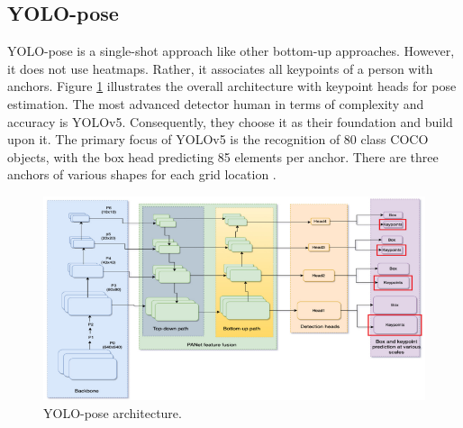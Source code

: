 \subsection{YOLO-pose}
\label{subsec:yolopose}

YOLO-pose is a single-shot approach like other bottom-up approaches. However, it does not use heatmaps. Rather, it associates all keypoints of a person with anchors. Figure \ref{fig:YOLO-pose-architecture} illustrates the overall architecture with keypoint
heads for pose estimation. The most advanced detector human in terms of complexity and accuracy is YOLOv5. Consequently, they choose it as their foundation and build upon it.
The primary focus of YOLOv5 is the recognition of 80 class COCO objects, with the box head predicting 85 elements per anchor. There are three anchors of various shapes for each grid location \parencite{maji2022yolopose}.

\begin{figure}[ht]
  \centering
  \includegraphics[scale=1.01]{gambar/yolo-architecture.png}
  \caption{YOLO-pose architecture.}
  \label{fig:YOLO-pose-architecture}
\end{figure}

